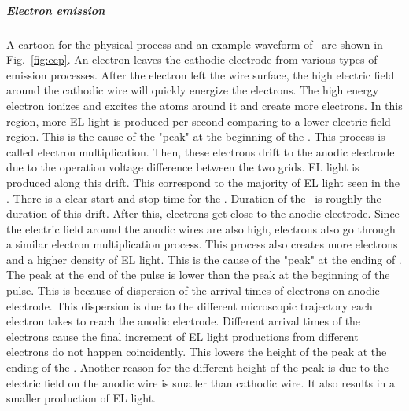 \subparagraph{Electron emission} A cartoon for the physical process and an example waveform of \eep\ are shown in Fig.~\ref{fig:eep}. An electron leaves the cathodic electrode from various types of emission processes. After the electron left the wire surface, the high electric field around the cathodic wire will quickly energize the electrons. The high energy electron ionizes and excites the atoms around it and create more electrons. In this region, more EL light is produced per second comparing to a lower electric field region. This is the cause of the "peak" at the beginning of the \eep . This process is called electron multiplication. Then, these electrons drift to the anodic electrode due to the operation voltage difference between the two grids. EL light is produced along this drift. This correspond to the majority of EL light seen in the \eep . There is a clear start and stop time for the \eep . Duration of the \eep\ is roughly the duration of this drift. After this, electrons get close to the anodic electrode. Since the electric field around the anodic wires are also high, electrons also go through a similar electron multiplication process. This process also creates more electrons and a higher density of EL light. This is the cause of the "peak" at the ending of \eep . The peak at the end of the pulse is lower than the peak at the beginning of the pulse. This is because of dispersion of the arrival times of electrons on anodic electrode. This dispersion is due to the different microscopic trajectory each electron takes to reach the anodic electrode. Different arrival times of the electrons cause the final increment of EL light productions from different electrons do not happen coincidently. This lowers the height of the peak at the ending of the \eep . Another reason for the different height of the peak is due to the electric field on the anodic wire is smaller than cathodic wire. It also results in a smaller production of EL light.

